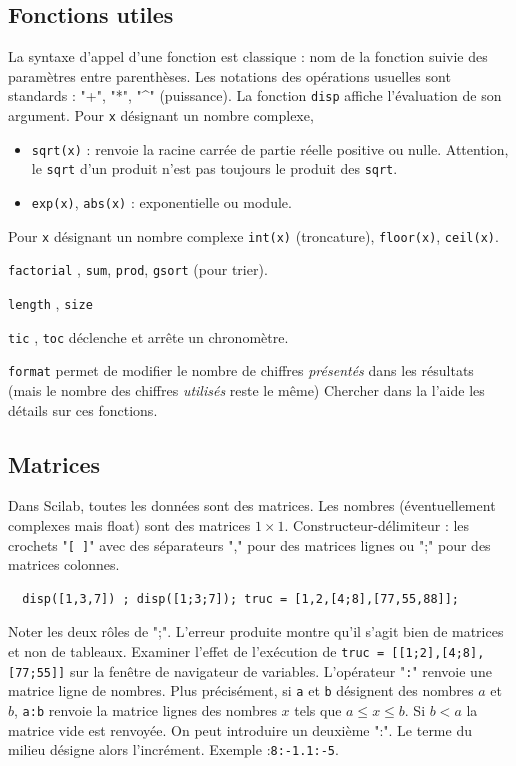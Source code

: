 \subsection{Fonctions utiles}
La syntaxe d'appel d'une fonction est classique : nom de la fonction suivie des paramètres entre parenthèses. Les notations des opérations usuelles sont standards : "+", "*", "\textasciicircum" (puissance).\newline
La fonction \texttt{disp} affiche l'évaluation de son argument.\newline
Pour \texttt{x} désignant un nombre complexe,
\begin{itemize}
  \item \texttt{sqrt(x)} : renvoie la racine carrée de partie réelle positive ou nulle. Attention, le \texttt{sqrt} d'un produit n'est pas toujours le produit des \texttt{sqrt}. 
  \item \texttt{exp(x)}, \texttt{abs(x)} : exponentielle ou module.  
\end{itemize}
Pour \texttt{x} désignant un nombre complexe \texttt{int(x)} (troncature), \texttt{floor(x)}, \texttt{ceil(x)}.

\texttt{factorial} , \texttt{sum}, \texttt{prod}, \texttt{gsort} (pour trier).

\texttt{length} , \texttt{size}

\texttt{tic} , \texttt{toc} déclenche et arrête un chronomètre.

\texttt{format} permet de modifier le nombre de chiffres \emph{présentés} dans les résultats (mais le nombre des chiffres \emph{utilisés} reste le même)
Chercher dans la l'aide les détails sur ces fonctions.

\subsection{Matrices}
Dans Scilab, toutes les données sont des matrices. Les nombres (éventuellement complexes mais float) sont des matrices $1\times1$.\newline
Constructeur-délimiteur : les crochets "\texttt{[ ]}" avec des séparateurs "," pour des matrices lignes ou ";" pour des matrices colonnes.
\begin{verbatim}
  disp([1,3,7]) ; disp([1;3;7]); truc = [1,2,[4;8],[77,55,88]];
\end{verbatim}
Noter les deux rôles de ";". L'erreur produite montre qu'il s'agit bien de matrices et non de tableaux.\newline
Examiner l'effet de l'exécution de \texttt{truc = [[1;2],[4;8],[77;55]]} sur la fenêtre de navigateur de variables.\newline
L'opérateur "\texttt{:}" renvoie une matrice ligne de nombres. Plus précisément, si \texttt{a} et \texttt{b} désignent des nombres $a$ et $b$, \texttt{a:b} renvoie la matrice lignes des nombres $x$ tels que $a\leq x \leq b$. Si $b<a$ la matrice vide est renvoyée. On peut introduire un deuxième ":". Le terme du milieu désigne alors l'incrément. Exemple :\texttt{8:-1.1:-5}.

